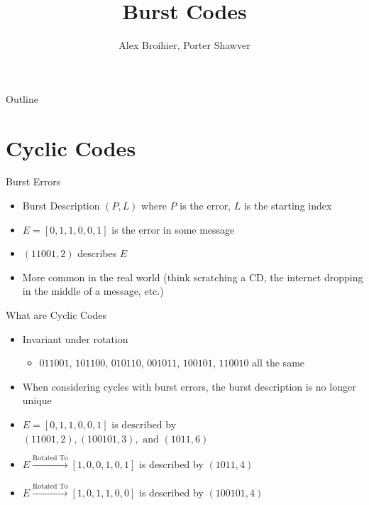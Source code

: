\documentclass[aspectratio=169]{beamer}
\title{Burst Codes}
\author{Alex Broihier, Porter Shawver}
\date{}
\begin{document}

\begin{frame}
\titlepage
\end{frame}

\begin{frame}{Outline}
  \tableofcontents
\end{frame}

\section{Cyclic Codes}
\frame{\sectionpage}

\begin{frame}{Burst Errors}
    \begin{itemize}
        \item Burst Description $(P, L)$ where $P$ is the error, $L$ is the starting index
        \item $E = [0, 1, 1, 0, 0, 1]$ is the error in some message
        \item $(11001, 2)$ describes $E$ 
        \item More common in the real world (think scratching a CD, the internet dropping in the middle of a message, etc.)
    \end{itemize}
\end{frame}




\begin{frame}{What are Cyclic Codes}
    \begin{itemize}
        \item Invariant under rotation
        \begin{itemize}
            \item $011001$, $101100$, $010110$, $001011$, $100101$, $110010$ all the same
        \end{itemize}
        \item When considering cycles with burst errors, the burst description is no longer unique \pause
        \item $E = [0, 1, 1, 0, 0, 1]$ is described by $(11001, 2), (100101, 3), \text{ and } (1011, 6)$ \pause
        \item $E \xrightarrow[]{\text{Rotated To}} [1, 0, 0, 1, 0, 1]$ is described by $(1011, 4)$
        \item $E \xrightarrow[]{\text{Rotated To}} [1, 0, 1, 1, 0, 0]$ is described by $(100101, 4)$
    \end{itemize}
\end{frame}
\end{document}

